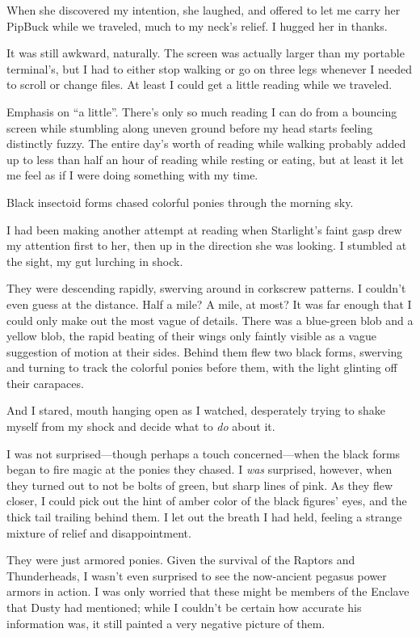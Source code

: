When she discovered my intention, she laughed, and offered to let me carry her PipBuck while we traveled, much to my neck’s relief. I hugged her in thanks.

It was still awkward, naturally. The screen was actually larger than my portable terminal’s, but I had to either stop walking or go on three legs whenever I needed to scroll or change files. At least I could get a little reading while we traveled.

Emphasis on “a little”. There’s only so much reading I can do from a bouncing screen while stumbling along uneven ground before my head starts feeling distinctly fuzzy. The entire day’s worth of reading while walking probably added up to less than half an hour of reading while resting or eating, but at least it let me feel as if I were doing something with my time.

{\br}%
Black insectoid forms chased colorful ponies through the morning sky.

I had been making another attempt at reading when Starlight’s faint gasp drew my attention first to her, then up in the direction she was looking. I stumbled at the sight, my gut lurching in shock.

They were descending rapidly, swerving around in corkscrew patterns. I couldn’t even guess at the distance. Half a mile? A mile, at most? It was far enough that I could only make out the most vague of details. There was a blue-green blob and a yellow blob, the rapid beating of their wings only faintly visible as a vague suggestion of motion at their sides. Behind them flew two black forms, swerving and turning to track the colorful ponies before them, with the light glinting off their carapaces.

And I stared, mouth hanging open as I watched, desperately trying to shake myself from my shock and decide what to \textit{do} about it.

I was not surprised—though perhaps a touch concerned—when the black forms began to fire magic at the ponies they chased. I \textit{was} surprised, however, when they turned out to not be bolts of green, but sharp lines of pink. As they flew closer, I could pick out the hint of amber color of the black figures’ eyes, and the thick tail trailing behind them. I let out the breath I had held, feeling a strange mixture of relief and disappointment.

They were just armored ponies. Given the survival of the Raptors and Thunderheads, I wasn’t even surprised to see the now-ancient pegasus power armors in action. I was only worried that these might be members of the Enclave that Dusty had mentioned; while I couldn’t be certain how accurate his information was, it still painted a very negative picture of them.

